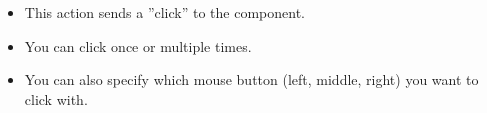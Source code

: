 \begin{itemize}
\item This action sends a ''click''
 to the component.
\item You can click once or multiple times. 
\item You can also specify which mouse button (left, middle, right) you want to click with. 
\end{itemize}
